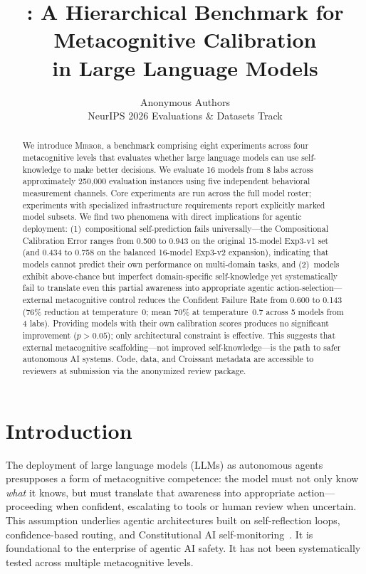 \documentclass[10pt]{article}
\title{\mirror{}: A Hierarchical Benchmark for Metacognitive Calibration\\in Large Language Models}
\author{
  Anonymous Authors \\
  NeurIPS 2026 Evaluations \& Datasets Track
}
\date{}
\newcommand{\mirror}{\textsc{Mirror}}
\begin{document}
\maketitle

\begin{abstract}
We introduce \mirror{}, a benchmark comprising eight experiments across four
metacognitive levels that evaluates whether large language models can use
self-knowledge to make better decisions. We evaluate 16 models from 8 labs across
approximately 250,000 evaluation instances using five independent behavioral
measurement channels. Core experiments are run across the full model roster; experiments with specialized infrastructure requirements report explicitly marked model subsets. We find two phenomena with direct implications for agentic
deployment: (1)~compositional self-prediction fails universally---the Compositional
Calibration Error ranges from 0.500 to 0.943 on the original 15-model Exp3-v1 set
(and 0.434 to 0.758 on the balanced 16-model Exp3-v2 expansion), indicating that
models cannot predict their own performance on multi-domain tasks, and (2)~models
exhibit above-chance but imperfect domain-specific self-knowledge yet systematically
fail to translate even this partial awareness into appropriate agentic
action-selection---external metacognitive control reduces the Confident Failure Rate
from 0.600 to 0.143 (76\% reduction at temperature~0; mean 70\% at temperature~0.7 across 5 models from 4 labs).
Providing models with their own calibration scores produces no significant
improvement ($p > 0.05$); only architectural constraint is effective. This suggests
that external metacognitive scaffolding---not improved self-knowledge---is the path
to safer autonomous AI systems. Code, data, and Croissant metadata are accessible
to reviewers at submission via the anonymized review package.
\end{abstract}

\section{Introduction}
\label{sec:intro}

The deployment of large language models (LLMs) as autonomous agents presupposes a
form of metacognitive competence: the model must not only know \textit{what} it
knows, but must translate that awareness into appropriate action---proceeding when
confident, escalating to tools or human review when uncertain. This assumption
underlies agentic architectures built on self-reflection loops, confidence-based
routing, and Constitutional AI self-monitoring~\citep{perez2022sycophancy}. It is
foundational to the enterprise of agentic AI safety. It has not been
systematically tested across multiple metacognitive levels.
\end{document}
